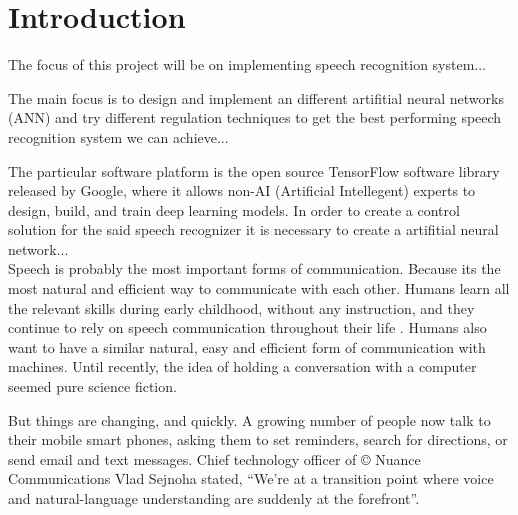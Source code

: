 \chapter{Introduction}\label{ch:introduction}

The focus of this project will be on implementing speech recognition system...

The main focus is to design and implement an different artifitial neural networks (ANN) and try different regulation techniques to get the best performing speech recognition system we can achieve...

The particular software platform is the open source TensorFlow \cite{tensorflow2015-whitepaper} software library released by Google, where it allows non-AI (Artificial Intellegent) experts to design, build, and train deep learning models. In order to create a control solution for the said speech recognizer it is necessary to create a artifitial neural network...\\

Speech is probably the most important forms of communication. Because its the most natural and efficient way to communicate with each other. Humans learn all the relevant skills during early childhood, without any instruction, and they continue to rely on speech communication throughout their life \cite{kamblespeech}. Humans also want to have a similar natural, easy and efficient form of communication with machines. Until recently, the idea of holding a conversation with a computer seemed pure science fiction.

But things are changing, and quickly. A growing number of people now talk to their mobile smart phones, asking them to set reminders, search for directions, or send email and text messages. Chief technology officer of \copyright{} Nuance Communications Vlad Sejnoha stated, “We’re at a transition point where voice and natural-language understanding are suddenly at the forefront”.




\cite{kamblespeech}
 






